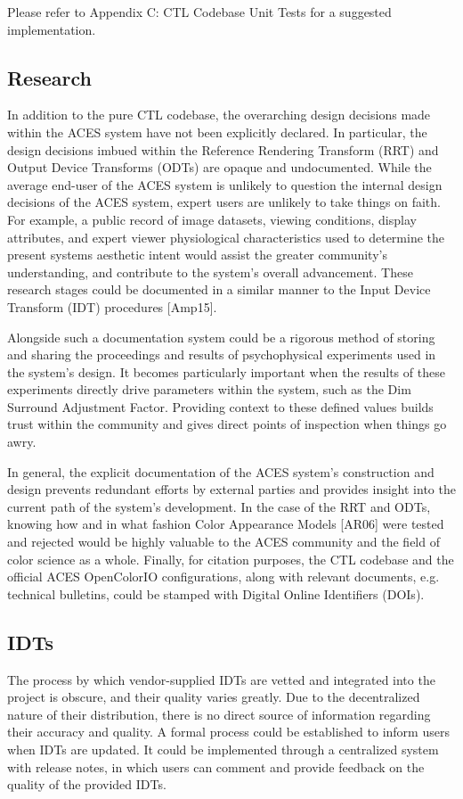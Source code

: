 \documentclass[conference]{IEEEtran}
\begin{document}
Please refer to Appendix C: CTL Codebase Unit Tests for a suggested implementation.

\subsection{Research}
In addition to the pure CTL codebase, the overarching design decisions made within the ACES system have not been explicitly declared. In particular, the design decisions imbued within the Reference Rendering Transform (RRT) and Output Device Transforms (ODTs) are opaque and undocumented. While the average end-user of the ACES system is unlikely to question the internal design decisions of the ACES system, expert users are unlikely to take things on faith. For example, a public record of image datasets, viewing conditions, display attributes, and expert viewer physiological characteristics used to determine the present systems aesthetic intent would assist the greater community's understanding, and contribute to the system's overall advancement. These research stages could be documented in a similar manner to the Input Device Transform (IDT) procedures [Amp15].

Alongside such a documentation system could be a rigorous method of storing and sharing the proceedings and results of psychophysical experiments used in the system's design. It becomes particularly important when the results of these experiments directly drive parameters within the system, such as the Dim Surround Adjustment Factor. Providing context to these defined values builds trust within the community and gives direct points of inspection when things go awry.

In general, the explicit documentation of the ACES system's construction and design prevents redundant efforts by external parties and provides insight into the current path of the system's development. In the case of the RRT and ODTs, knowing how and in what fashion Color Appearance Models [AR06] were tested and rejected would be highly valuable to the ACES community and the field of color science as a whole. Finally, for citation purposes, the CTL codebase and the official ACES OpenColorIO configurations, along with relevant documents, e.g. technical bulletins, could be stamped with Digital Online Identifiers (DOIs).

\subsection{IDTs}
The process by which vendor-supplied IDTs are vetted and integrated into the project is obscure, and their quality varies greatly. Due to the decentralized nature of their distribution, there is no direct source of information regarding their accuracy and quality. A formal process could be established to inform users when IDTs are updated. It could be implemented through a centralized system with release notes, in which users can comment and provide feedback on the quality of the provided IDTs.
\end{document}
